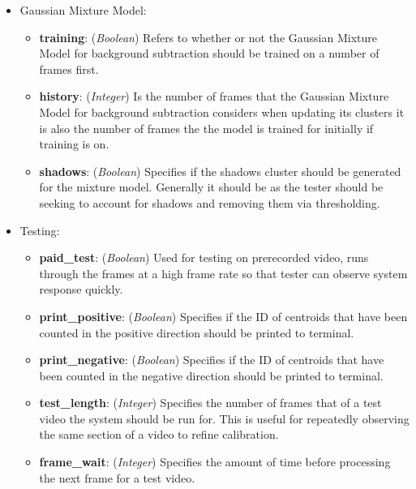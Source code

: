 \begin{itemize}
\item Gaussian Mixture Model:
    \begin{itemize}
        \item \textbf{training}: (\emph{Boolean}) Refers to whether or not the Gaussian Mixture Model for background subtraction should be trained on a number of frames first.
        \item \textbf{history}: (\emph{Integer}) Is the number of frames that the Gaussian Mixture Model for background subtraction considers when updating its clusters it is also the number of frames the the model is trained for initially if training is on.
        \item\textbf{shadows}: (\emph{Boolean}) Specifies if the shadows cluster should be generated for the mixture model. Generally it should be as the tester should be seeking to account for shadows and removing them via thresholding.
    \end{itemize}

\item Testing: 
    \begin{itemize}
        \item \textbf{paid\_test}: (\emph{Boolean}) Used for testing on prerecorded video, runs through the frames at a high frame rate so that tester can observe system response quickly.
        \item \textbf{print\_positive}: (\emph{Boolean}) Specifies if the ID of centroids that have been counted in the positive direction should be printed to terminal.
        \item \textbf{print\_negative}: (\emph{Boolean}) Specifies if the ID of centroids that have been counted in the negative direction should be printed to terminal.
        \item \textbf{test\_length}: (\emph{Integer}) Specifies the number of frames that of a test video the system should be run for. This is useful for repeatedly observing the same section of a video to refine calibration.
        \item\textbf{frame\_wait}: (\emph{Integer}) Specifies the amount of time before processing the next frame for a test video. 
    \end{itemize}


\end{itemize}
